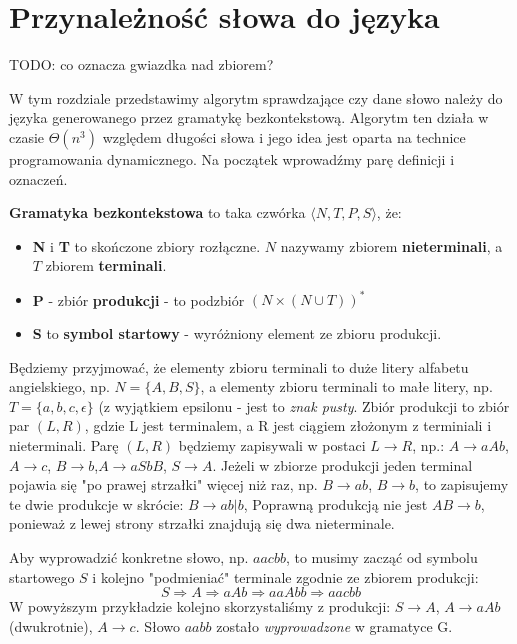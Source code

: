 \section{Przynależność słowa do języka}

TODO: co oznacza gwiazdka nad zbiorem?

W tym rozdziale przedstawimy algorytm sprawdzające czy dane słowo należy do języka generowanego przez gramatykę bezkontekstową.
Algorytm ten działa w czasie $\Theta(n^3)$ względem długości słowa i jego idea jest oparta na technice programowania dynamicznego.
Na początek wprowadźmy parę definicji i oznaczeń.

\begin{definition}
\textbf{Gramatyka bezkontekstowa} to taka czwórka $\langle N, T, P, S \rangle$, że:
    \begin{itemize}
    	\item \textbf{N} i \textbf{T} to skończone zbiory rozłączne. 
        $N$ nazywamy zbiorem \textbf{nieterminali}, a $T$ zbiorem \textbf{terminali}.
        \item \textbf{P} - zbiór \textbf{produkcji} - to podzbiór $(N \times (N\cup T ))^*$
        \item \textbf{S} to \textbf{symbol startowy} - wyróżniony element ze zbioru produkcji.
    \end{itemize}
\end{definition}
Będziemy przyjmować, że elementy zbioru terminali to duże litery alfabetu angielskiego, np. $N = \{ A, B, S\}$, a elementy zbioru terminali to małe litery, np. $T = \{ a, b, c, \epsilon\}$ (z wyjątkiem epsilonu - jest to \textit{znak pusty}.
Zbiór produkcji to zbiór par $(L, R)$, gdzie L jest terminalem, a R jest ciągiem złożonym z terminiali i nieterminali. 
Parę $(L, R)$ będziemy zapisywali w postaci $L \rightarrow R$, np.: $A \rightarrow aAb$, $A \rightarrow c$, $B \rightarrow b$,$A \rightarrow aSbB$, $S \rightarrow A$. 
Jeżeli w zbiorze produkcji jeden terminal pojawia się "po prawej strzałki" więcej niż raz, np. $B \rightarrow ab$, $B \rightarrow b$, to zapisujemy te dwie produkcje w skrócie: $B \rightarrow ab |  b$, 
Poprawną produkcją nie jest $AB \rightarrow b$, ponieważ z lewej strony strzałki znajdują się dwa nieterminale.

Aby wyprowadzić konkretne słowo, np. $aacbb$, to musimy zacząć od symbolu startowego $S$ i kolejno "podmieniać" terminale zgodnie ze zbiorem produkcji:
 \[ S \Rightarrow A \Rightarrow aAb \Rightarrow aaAbb \Rightarrow aacbb \]
W powyższym przykładzie kolejno skorzystaliśmy z produkcji: $S \rightarrow A$, $A \rightarrow aAb$ (dwukrotnie),   $A \rightarrow c$. Słowo $aabb$ zostało \textit{wyprowadzone} w gramatyce G.

